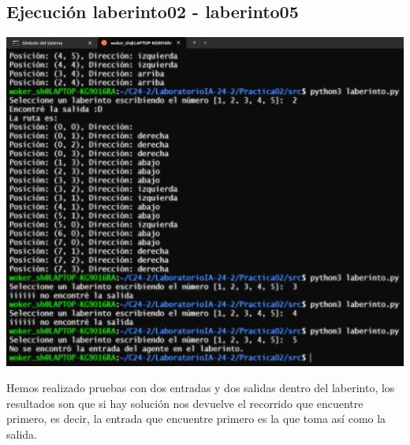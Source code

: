 \documentclass[a4paper,12pt]{article}
\begin{document}
\subsection*{Ejecución laberinto02 - laberinto05}
\begin{center}
    \includegraphics[scale = .5]{IMA/ejecuciones25.png}
\end{center}

Hemos realizado pruebas con dos entradas y dos salidas dentro del laberinto, los resultados son 
que si hay solución nos devuelve el recorrido que encuentre primero, es decir, la entrada que 
encuentre primero es la que toma así como la salida. 




\newpage %
\thispagestyle{fancyref}
\printbibliography %
\end{document}
